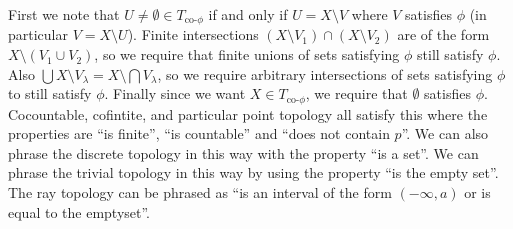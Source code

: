 \documentclass{article}
\begin{document}
 {
    First we note that $U\neq\emptyset\in T_{\text{co-}\phi}$ if and only if $U = X\setminus V$ where $V$ satisfies $\phi$ (in particular $V = X\setminus U$). Finite intersections $(X\setminus V_{1})\cap (X\setminus V_{2})$ are of the form $X\setminus (V_{1}\cup V_{2})$, so we require that finite unions of sets satisfying $\phi$ still satisfy $\phi$. Also $\bigcup X\setminus V_{\lambda} = X\setminus \bigcap V_{\lambda}$, so we require arbitrary intersections of sets satisfying $\phi$ to still satisfy $\phi$. Finally since we want $X\in T_{\text{co-}\phi} $, we require that $\emptyset$ satisfies $\phi$. Cocountable, cofintite, and particular point topology all satisfy this where the properties are ``is finite'', ``is countable'' and ``does not contain $p$''. We can also phrase the discrete topology in this way with the property ``is a set''. We can phrase the trivial topology in this way by using the property ``is the empty set''. The ray topology can be phrased as ``is an interval of the form $(-\infty, a)$ or is equal to the emptyset''.
}
\end{document}
